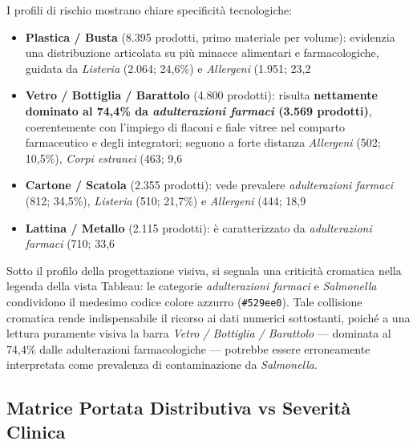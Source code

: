 I profili di rischio mostrano chiare specificità tecnologiche:
\begin{itemize}
    \item \textbf{Plastica / Busta} (8.395 prodotti, primo materiale per volume): evidenzia una distribuzione articolata su più minacce alimentari e farmacologiche, guidata da \textit{Listeria} (2.064; 24,6\%) e \textit{Allergeni} (1.951; 23,2%
    \item \textbf{Vetro / Bottiglia / Barattolo} (4.800 prodotti): risulta \textbf{nettamente dominato al 74,4\% da \textit{adulterazioni farmaci} (3.569 prodotti)}, coerentemente con l'impiego di flaconi e fiale vitree nel comparto farmaceutico e degli integratori; seguono a forte distanza \textit{Allergeni} (502; 10,5\%), \textit{Corpi estranei} (463; 9,6%
    \item \textbf{Cartone / Scatola} (2.355 prodotti): vede prevalere \textit{adulterazioni farmaci} (812; 34,5\%), \textit{Listeria} (510; 21,7\%) e \textit{Allergeni} (444; 18,9%
    \item \textbf{Lattina / Metallo} (2.115 prodotti): è caratterizzato da \textit{adulterazioni farmaci} (710; 33,6%
\end{itemize}

Sotto il profilo della progettazione visiva, si segnala una criticità cromatica nella legenda della vista Tableau: le categorie \textit{adulterazioni farmaci} e \textit{Salmonella} condividono il medesimo codice colore azzurro (\texttt{\#529ee0}). Tale collisione cromatica rende indispensabile il ricorso ai dati numerici sottostanti, poiché a una lettura puramente visiva la barra \textit{Vetro / Bottiglia / Barattolo} --- dominata al 74,4\% dalle adulterazioni farmacologiche --- potrebbe essere erroneamente interpretata come prevalenza di contaminazione da \textit{Salmonella}.

\subsection{Matrice Portata Distributiva vs Severità Clinica}

